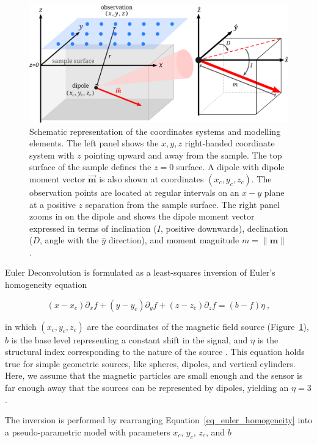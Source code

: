 \begin{figure}[tb]
\centering
\includegraphics[width=\linewidth]{figures/coordinate-system-sketch.png}
\caption{
Schematic representation of the coordinates systems and modelling elements.
The left panel shows the $x, y, z$ right-handed coordinate system with $z$
pointing upward and away from the sample. The top surface of the sample defines
the $z=0$ surface. A dipole with dipole moment vector $\mathbf{\vec{m}}$ is
also shown at coordinates $(x_c, y_c, z_c)$. The observation points are located
at regular intervals on an $x-y$ plane at a positive $z$ separation from the
sample surface. The right panel zooms in on the dipole and shows the dipole
moment vector expressed in terms of inclination ($I$, positive downwards),
declination ($D$, angle with the $\hat{y}$ direction), and moment magnitude $m
= \|\mathbf{m}\|$.
}
\label{fig_coordinate_systems}
\end{figure}

Euler Deconvolution is formulated as a least-squares inversion of Euler's
homogeneity equation

\begin{equation}
\label{eq_euler_homogeneity}
(x - x_c)\partial_x f
+ (y - y_c)\partial_y f
+ (z - z_c)\partial_z f
= (b - f)\eta
\ ,
\end{equation}

\noindent
in which $(x_c, y_c, z_c)$ are the coordinates of the magnetic field source (Figure~\ref{fig_coordinate_systems}), $b$ is the base level representing a constant shift in the signal, and $\eta$ is the structural index corresponding to the nature of the source \citep{Reid1990}. This equation holds true for simple geometric sources, like spheres, dipoles, and vertical cylinders. Here, we assume that the magnetic particles are small enough and the sensor is far enough away that the sources can be represented by dipoles, yielding an $\eta=3$.

The inversion is performed by rearranging Equation~\ref{eq_euler_homogeneity} into a pseudo-parametric model with parameters $x_c$, $y_c$, $z_c$, and $b$

